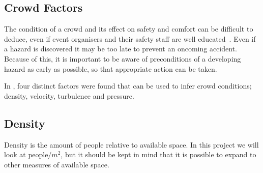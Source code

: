 




\subsection{Crowd Factors}

The condition of a crowd and its effect on safety and comfort can be difficult to deduce, even if event organisers and their safety staff are well educated~\cite{franke2015smart}. Even if a hazard is discovered it may be too late to prevent an oncoming accident. Because of this, it is important to be aware of preconditions of a developing hazard as early as possible, so that appropriate action can be taken.

In \citet{wirz2012inferring}, four distinct factors were found that can be used to infer crowd conditions; density, velocity, turbulence and pressure.

\subsection{Density}
Density is the amount of people relative to available space. In this project we will look at $\text{people} / m^2$, but it should be kept in mind that it is possible to expand to other measures of available space.

